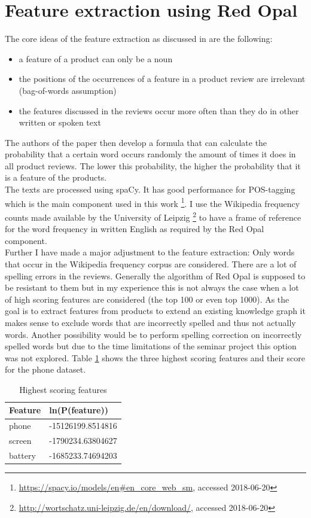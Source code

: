 \section{Feature extraction using Red Opal}
\label{sec:feature-extraction}
The core ideas of the feature extraction as discussed in \cite{scaffidi2007red} are the following:
\begin{itemize}
    \item a feature of a product can only be a noun
    \item the positions of the occurrences of a feature in a product review are irrelevant (bag-of-words assumption)
    \item the features discussed in the reviews occur more often than they do in other written or spoken text
\end{itemize}
The authors of the paper then develop a formula that can calculate the probability that a certain word occurs randomly the amount of times it does in all product reviews. The lower this probability, the higher the probability that it is a feature of the products. \\
The texts are processed using spaCy. It has good performance for POS-tagging which is the main component used in this work \footnote{\url{https://spacy.io/models/en#en_core_web_sm}, accessed 2018-06-20}. I use the Wikipedia frequency counts made available by the University of Leipzig \footnote{\url{http://wortschatz.uni-leipzig.de/en/download/}, accessed 2018-06-20} to have a frame of reference for the word frequency in written English as required by the Red Opal component.\\
Further I have made a major adjustment to the feature extraction: Only words that occur in the Wikipedia frequency corpus are considered. There are a lot of spelling errors in the reviews. Generally the algorithm of Red Opal is supposed to be resistant to them but in my experience this is not always the case when a lot of high scoring features are considered (the top 100 or even top 1000). As the goal is to extract features from products to extend an existing knowledge graph it makes sense to exclude words that are incorrectly spelled and thus not actually words. Another possibility would be to perform spelling correction on incorrectly spelled words but due to the time limitations of the seminar project this option was not explored.
Table \ref{table:scaff-features} shows the three highest scoring features and their score for the phone dataset.
\begin{minipage}{0.4\textwidth}
    \begin{table}[H]
    \vspace{-2em}
        \centering
        \caption{Highest scoring features}
        \label{table:scaff-features}
        \begin{tabular}{l|l}
            Feature & ln(P(feature)) \\ \hline
            phone & -15126199.8514816 \\
            screen & -1790234.63804627 \\
            battery & -1685233.74694203
        \end{tabular}
    \end{table}
\end{minipage}
